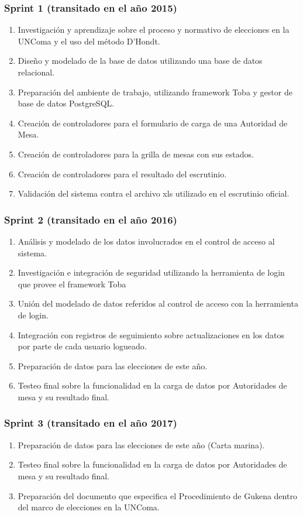 \subsubsection{Sprint 1 (transitado en el año 2015)}

\begin{enumerate}    
    \item Investigación y aprendizaje sobre el proceso y normativo de elecciones en la UNComa y el uso del método D'Hondt.
    \item Diseño y modelado de la base de datos utilizando una base de datos relacional.
    \item Preparación del ambiente de trabajo, utilizando framework Toba y gestor de base de datos PostgreSQL.
    \item Creación de controladores para el formulario de carga de una Autoridad de Mesa.
    \item Creación de controladores para la grilla de mesas con sus estados.
    \item Creación de controladores para el resultado del escrutinio.
    \item Validación del sistema contra el archivo xls utilizado en el escrutinio oficial.
\end{enumerate}
\subsubsection{Sprint 2 (transitado en el año 2016)}
\begin{enumerate}
    \item Análisis y modelado de los datos involucrados en el control de acceso al sistema.
    \item Investigación e integración de seguridad utilizando la herramienta de login que provee el framework Toba
    \item Unión del modelado de datos referidos al control de acceso con la herramienta de login.
    \item Integración con registros de seguimiento sobre actualizaciones en los datos por parte de cada usuario logueado.
    \item Preparación de datos para las elecciones de este año.
    \item Testeo final sobre la funcionalidad en la carga de datos por Autoridades de mesa y su resultado final.
\end{enumerate}
\subsubsection{Sprint 3 (transitado en el año 2017)}
\begin{enumerate}
    \item Preparación de datos para las elecciones de este año (Carta marina).
    \item Testeo final sobre la funcionalidad en la carga de datos por Autoridades de mesa y su resultado final.
    \item Preparación del documento que especifica el Procedimiento de Gukena dentro del marco de elecciones en la UNComa.
\end{enumerate}
